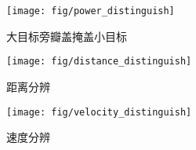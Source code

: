 \documentclass[../main]{subfiles}
\begin{document}
\begin{figure}[htbp]
  \centering
  \texttt{[image: fig/power\_distinguish]}
  \caption{大目标旁瓣盖掩盖小目标}%
  \label{fig:amplitude_distinguish_db}
\end{figure}

\begin{figure}[htbp]
  \centering
  \texttt{[image: fig/distance\_distinguish]}
  \caption{距离分辨}%
  \label{fig:distance_distinguish}
\end{figure}

\begin{figure}[htbp]
  \centering
  \texttt{[image: fig/velocity\_distinguish]}
  \caption{速度分辨}%
  \label{fig:velocity_distinguish}
\end{figure}
\end{document}
